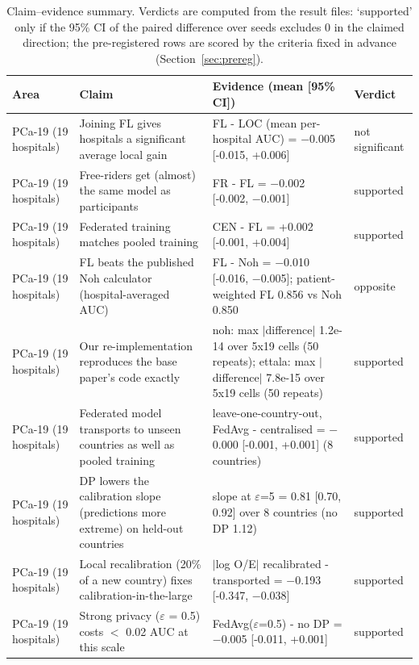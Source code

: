 \begin{table}[t]
\caption{Claim--evidence summary. Verdicts are computed from the result files: `supported' only if the 95\% CI of the paired difference over seeds excludes 0 in the claimed direction; the pre-registered rows are scored by the criteria fixed in advance (Section~\ref{sec:prereg}).}
\centering\scriptsize
\begin{tabular}{p{1.4cm}p{4.2cm}p{8.6cm}p{1.5cm}}
\toprule
Area & Claim & Evidence (mean [95\% CI]) & Verdict \\
\midrule
PCa-19 (19 hospitals) & Joining FL gives hospitals a significant average local gain & FL - LOC (mean per-hospital AUC) = \ensuremath{-}0.005 {[}-0.015, +0.006{]} & not significant \\
PCa-19 (19 hospitals) & Free-riders get (almost) the same model as participants & FR - FL = \ensuremath{-}0.002 {[}-0.002, \ensuremath{-}0.001{]} & supported \\
PCa-19 (19 hospitals) & Federated training matches pooled training & CEN - FL = +0.002 {[}-0.001, +0.004{]} & supported \\
PCa-19 (19 hospitals) & FL beats the published Noh calculator (hospital-averaged AUC) & FL - Noh = \ensuremath{-}0.010 {[}-0.016, \ensuremath{-}0.005{]}; patient-weighted FL 0.856 vs Noh 0.850 & opposite \\
PCa-19 (19 hospitals) & Our re-implementation reproduces the base paper's code exactly & noh: max $|$difference$|$ 1.2e-14 over 5x19 cells (50 repeats); ettala: max $|$difference$|$ 7.8e-15 over 5x19 cells (50 repeats) & supported \\
PCa-19 (19 hospitals) & Federated model transports to unseen countries as well as pooled training & leave-one-country-out, FedAvg - centralised = \ensuremath{-}0.000 {[}-0.001, +0.001{]} (8 countries) & supported \\
PCa-19 (19 hospitals) & DP lowers the calibration slope (predictions more extreme) on held-out countries & slope at $\varepsilon$=5 = 0.81 {[}0.70, 0.92{]} over 8 countries (no DP 1.12) & supported \\
PCa-19 (19 hospitals) & Local recalibration (20\% of a new country) fixes calibration-in-the-large & $|$log O/E$|$ recalibrated - transported = \ensuremath{-}0.193 {[}-0.347, \ensuremath{-}0.038{]} & supported \\
PCa-19 (19 hospitals) & Strong privacy ($\varepsilon$ = 0.5) costs $<$ 0.02 AUC at this scale & FedAvg($\varepsilon$=0.5) - no DP = \ensuremath{-}0.005 {[}-0.011, +0.001{]} & supported \\

\end{tabular}
\end{table}
